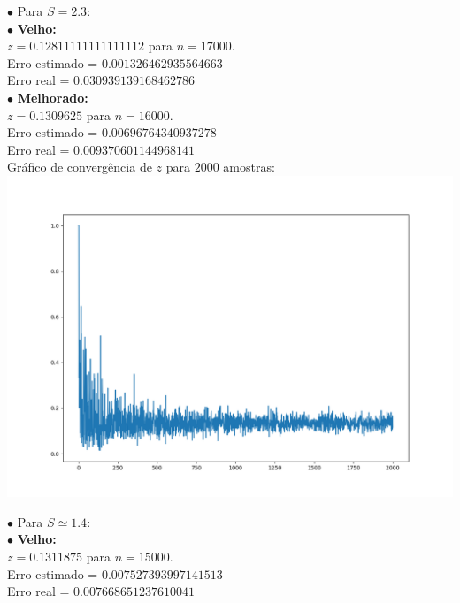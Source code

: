 \documentclass[pt12]{article}
\begin{document}
\indent $\bullet$ Para $S = 2.3$:\\

\indent \indent $\bullet$ \textbf{Velho:}\\

\indent \indent $z  = 0.12811111111111112$ para $n = 17000$.\\
\indent \indent Erro estimado = $0.001326462935564663$\\
\indent \indent Erro real = $0.030939139168462786$\\

\indent \indent $\bullet$ \textbf{Melhorado:}\\

\indent \indent $z  = 0.1309625  $ para $n = 16000$.\\
\indent \indent Erro estimado = $0.00696764340937278$\\
\indent \indent Erro real = $0.009370601144968141$\\

\newpage
\indent \indent Gráfico de convergência de $z$ para $2000$ amostras:\\

\includegraphics[scale=0.4]{ConvergZ_B_2.png}

\indent $\bullet$ Para $S \simeq 1.4$:\\

\indent \indent $\bullet$ \textbf{Velho:}\\

\indent \indent $z  = 0.1311875 $ para $n = 15000$.\\
\indent \indent Erro estimado = $0.007527393997141513$\\
\indent \indent Erro real = $0.007668651237610041$\\
\end{document}
